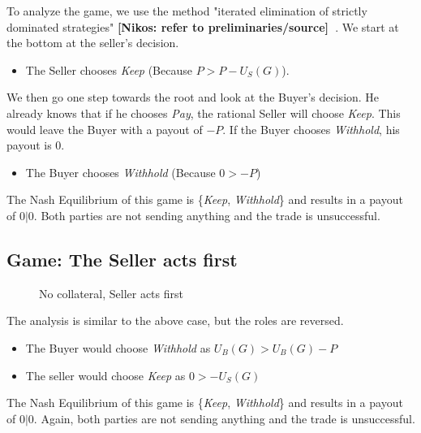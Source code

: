 \documentclass{cacthesis}
\newcommand{\authnote}[3]{{ \footnotesize \textbf{#1[#2: #3]~}}}
\newcommand{\niknote}[1]{\authnote{\color{red}}{Nikos}{#1}}
\begin{document}
To analyze the game, we use the method "iterated elimination of strictly dominated strategies"\niknote{refer to preliminaries/source}. We start at the bottom at the seller's decision.
\begin{itemize}
    \item The Seller chooses \emph{Keep} (Because $P > P - U_S(G)$).
\end{itemize}
    We then go one step towards the root and look at the Buyer's decision. He already knows that if he chooses \emph{Pay}, the rational Seller will choose \emph{Keep}. This would leave the Buyer with a payout of $-P$. If the Buyer chooses \emph{Withhold}, his payout is $0$.
\begin{itemize}
    \item The Buyer chooses \emph{Withhold} (Because $0 > -P$)
\end{itemize} 
The Nash Equilibrium of this game is \{\emph{Keep}, \emph{Withhold}\} and results in a payout of $0|0$. Both parties are not sending anything and the trade is unsuccessful.

\subsection{Game: The Seller acts first} 

\begin{figure}[htb!]
\label{fig:nocol-seller-first}
\caption{No collateral, Seller acts first}
\end{figure}


The analysis is similar to the above case, but the roles are reversed. 
\begin{itemize}
    \item The Buyer would choose \emph{Withhold} as $U_B(G) > U_B(G)-P$
    \item The seller would choose \emph{Keep} as $0 > -U_S(G)$
\end{itemize}
The Nash Equilibrium of this game is \{\emph{Keep}, \emph{Withhold}\} and results in a payout of $0|0$. Again, both parties are not sending anything and the trade is unsuccessful.
\end{document}
